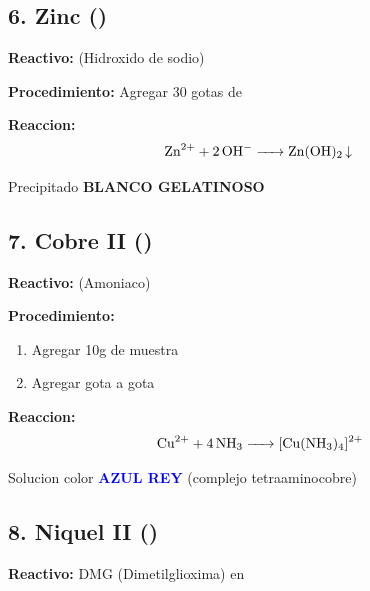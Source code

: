 \documentclass[11pt,a4paper]{article}
\begin{document}
\subsection{6. Zinc ()}

\textbf{Reactivo:}  (Hidroxido de sodio)

\textbf{Procedimiento:} Agregar 30 gotas de 

\begin{reaccionbox}
\textbf{Reaccion:}
\begin{equation*}
\ce{Zn^{2+} + 2OH^- -> Zn(OH)2 v}
\end{equation*}
\end{reaccionbox}

\begin{resultado}
Precipitado \textbf{BLANCO GELATINOSO}
\end{resultado}

\subsection{7. Cobre II ()}

\textbf{Reactivo:}  (Amoniaco)

\textbf{Procedimiento:}
\begin{enumerate}[leftmargin=*]
    \item Agregar 10g de muestra
    \item Agregar  gota a gota
\end{enumerate}

\begin{reaccionbox}
\textbf{Reaccion:}
\begin{equation*}
\ce{Cu^{2+} + 4NH3 -> [Cu(NH3)4]^{2+}}
\end{equation*}
\end{reaccionbox}

\begin{resultado}
Solucion color \textbf{\textcolor{blue}{AZUL REY}} (complejo tetraaminocobre)
\end{resultado}

\subsection{8. Niquel II ()}

\textbf{Reactivo:} DMG (Dimetilglioxima) en 
\end{document}
